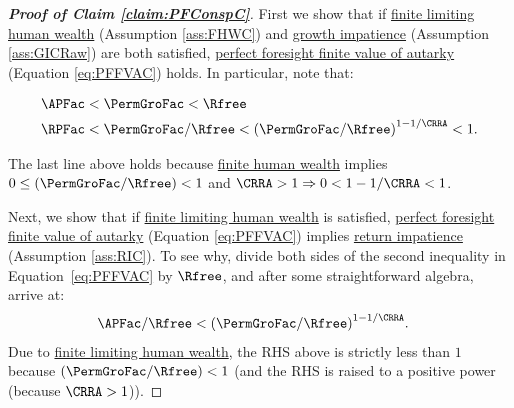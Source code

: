 \documentclass[\econtexRoot/BufferStockTheory]{subfiles}
\begin{document}
\begin{proof}[\textbf{Proof of Claim \ref{claim:PFConspC}}]
First we show that if \hyperlink{FHWC}{finite limiting human wealth} (Assumption \ref{ass:FHWC}) and \hyperlink{GICRaw}{growth impatience} (Assumption \ref{ass:GICRaw}) are both satisfied, \hyperlink{PFFVAC}{perfect foresight finite value of autarky} (Equation \eqref{eq:PFFVAC}) holds.
In particular, note that:
  
\begin{equation}\label{eq:GICandFHWCimplyPFFVAC}
  \begin{aligned}
    \APFac & < \PermGroFac < \Rfree
    \\   \RPFac & < \PermGroFac/\Rfree < {(\PermGroFac/\Rfree)}^{1-1/\CRRA} < 1.
  \end{aligned}
\end{equation}

The last line above holds because \hyperlink{FHWC}{finite human wealth} implies $0 \leq (\PermGroFac/\Rfree) < 1$ and $\CRRA > 1 \Rightarrow 0 < 1-1/\CRRA < 1$.


Next, we show that if \hyperlink{FHWC}{finite limiting human wealth} is satisfied, \hyperlink{PFFVAC}{perfect foresight finite value of autarky} (Equation \eqref{eq:PFFVAC}) implies \hyperlink{RIC}{return impatience} (Assumption \ref{ass:RIC}).
To see why, divide both sides of the second inequality in Equation~\eqref{eq:PFFVAC} by $\Rfree$, and after some straightforward algebra, arrive at:
%
  \begin{equation}\begin{gathered}\begin{aligned}
    \APFac/\Rfree & < {(\PermGroFac/\Rfree)}^{1-1/\CRRA}  \label{eq:FHWCandPFFVACimplyRIC}.
  \end{aligned}\end{gathered}\end{equation}
  Due to \hyperlink{FHWC}{finite limiting human wealth}, the RHS above is strictly less than $ 1$ because $(\PermGroFac/\Rfree) < 1$ (and the RHS is raised to a positive power (because $\CRRA>1$)).

\end{proof}
%

\end{document}
